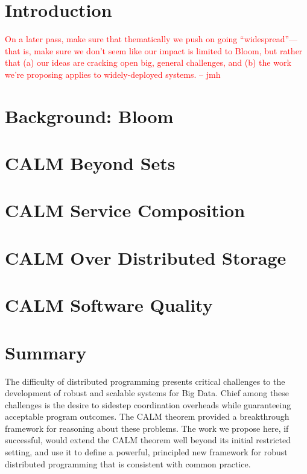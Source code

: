 \documentclass[11pt, us-letter]{article}
\newcommand{\jmh}[1]{{\textcolor{red}{#1 -- jmh}}}
\begin{document}


\pagebreak

\section{Introduction}
\jmh{On a later pass, make sure that thematically we push on going ``widespread''---that is, make sure we don't seem like our impact is limited to Bloom, but rather that (a) our ideas are cracking open big, general challenges, and (b) the work we're proposing applies to widely-deployed systems.}
\label{sec:intro}


\section{Background: Bloom}
\label{sec:bg}


\section{CALM Beyond Sets}
\label{sec:lattice}


\section{CALM Service Composition}
\label{sec:soa}


\section{CALM Over Distributed Storage}
\label{sec:storage}


\section{CALM Software Quality}
\label{sec:qa}


% 

% 

% 
% 
% 

\section{Summary}
The difficulty of distributed programming presents critical challenges to the development of robust and scalable systems for Big Data.  Chief among these challenges is the desire to sidestep coordination overheads while guaranteeing acceptable program outcomes.  The CALM theorem provided a breakthrough framework for reasoning about these problems.  The work we propose here, if successful, would extend the CALM theorem well beyond its initial restricted setting, and use it to define a powerful, principled new framework for robust distributed programming that is consistent with common practice.  

\newpage


\end{document}

